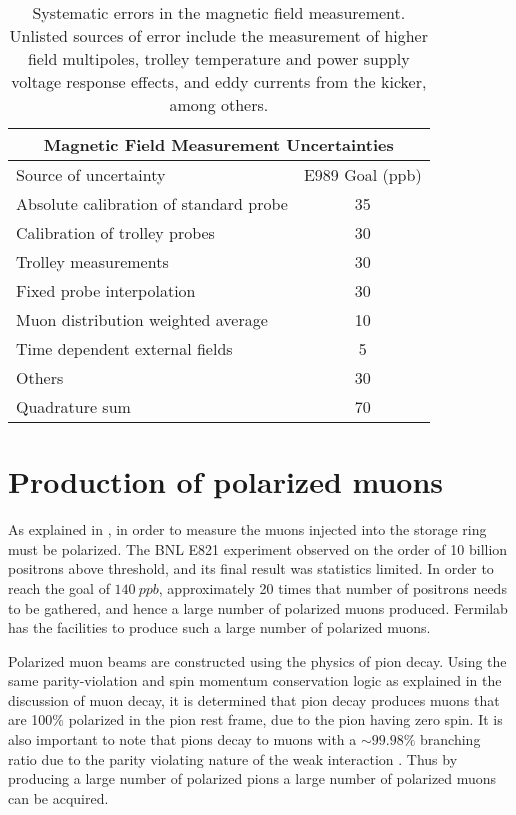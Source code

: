 \begin{table}
\centering
\setlength\tabcolsep{10pt}
\renewcommand{\arraystretch}{1.2}
\begin{tabular*}{.8\linewidth}{@{\extracolsep{\fill}}lc}
  \hline
    \multicolumn{2}{c}{\textbf{Magnetic Field Measurement Uncertainties}} \\
  \hline\hline
    Source of uncertainty & E989 Goal (ppb) \\
  \hline
    Absolute calibration of standard probe & 35 \\
    Calibration of trolley probes & 30 \\
    Trolley measurements & 30 \\
    Fixed probe interpolation & 30 \\
    Muon distribution weighted average & 10 \\
    Time dependent external fields & 5 \\
    Others & 30 \\
  \hline
    Quadrature sum & 70 \\
  \hline 
\end{tabular*}
\caption[Uncertainties in the magnetic field measurement]{Systematic errors in the magnetic field measurement. Unlisted sources of error include the measurement of higher field multipoles, trolley temperature and power supply voltage response effects, and eddy currents from the kicker, among others.}
\label{tab:magneticfielduncertainties}
\end{table}



\section{Production of polarized muons}
\label{sec:Accelerator}


As explained in , in order to measure \wa the muons injected into the storage ring must be polarized. The BNL E821 experiment observed on the order of 10 billion positrons above threshold, and its final result was statistics limited. In order to reach the goal of $\SI{140}{ppb}$, approximately 20 times that number of positrons needs to be gathered, and hence a large number of polarized muons produced. Fermilab has the facilities to produce such a large number of polarized muons.

Polarized muon beams are constructed using the physics of pion decay. Using the same parity-violation and spin momentum conservation logic as explained in the discussion of muon decay, it is determined that pion decay produces muons that are 100\% polarized in the pion rest frame, due to the pion having zero spin. It is also important to note that pions decay to muons with a $\sim 99.98\%$ branching ratio due to the parity violating nature of the weak interaction \cite{PDG}. Thus by producing a large number of polarized pions a large number of polarized muons can be acquired.


